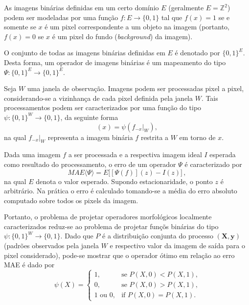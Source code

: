 \documentclass[10pt,a4paper,conference]{IEEEtran}
\begin{document}
As imagens binárias definidas em um certo domínio $E$ (geralmente
$E=\mathbb{Z}^2$) podem ser modeladas por uma função $f: E \to
\{0,1\}$ tal que $f(x)=1$ se e somente se $x$ é um pixel
correspondente a um objeto na imagem (portanto, $f(x)=0$ se $x$
é um pixel do fundo (\emph{background}) da imagem).

O conjunto de todas as imagens binárias definidas em $E$ é denotado
por $\{0,1\}^E$. Desta forma, um operador de imagens binárias é um
mapeamento do tipo $\Psi: \{0,1\}^E \to \{0,1\}^E$. 

Seja $W$ uma janela de observação. Imagens podem ser processadas pixel
a pixel, considerando-se a vizinhança de cada pixel definida pela
janela $W$. Tais processamentos podem ser caracterizados por uma
função do tipo $\psi: \{0,1\}^W \to \{0,1\}$, da seguinte forma
\begin{equation}
[\Psi(f)](x) = \psi(f_{-x}|_W),
\end{equation} 
na qual $f_{-x}|_W$ representa a imagem binária $f$ restrita a $W$ em
torno de $x$. 



Dada uma imagem $f$ a ser processada e a respectiva imagem ideal $I$
esperada como resultado do processamento, o erro de um operador $\Psi$
é caracterizado por
\begin{equation}
MAE\langle \Psi \rangle = E \big[ [\Psi(f)](z) - I(z) \big]\,,
\end{equation}
na qual $E$ denota o valor esperado.
Supondo estacionaridade, o ponto $z$ é arbitrário. Na prática o erro é
calculado tomando-se a média do erro absoluto computado sobre
todos os pixels da imagem.

Portanto, o problema de projetar operadores morfológicos localmente
caracterizados reduz-se ao problema de projetar funçõs binárias do
tipo $\psi: \{0,1\}^W \to \{0,1\}$.
Dado que $P$ é a distribuição conjunta do processo
$(\mathbf{X},\mathbf{y})$ (padrões observados pela janela $W$ e
respectivo valor da imagem de saída para o pixel considerado), pode-se
mostrar que o operador ótimo em relação ao erro MAE é dado por
\begin{equation}
\label{eq:opt}
\psi(X) = \left\{
          \begin{array}{ll}
          1, & \mbox{se $P(X,0)<P(X,1)$,}\\
          0, & \mbox{se $P(X,0)>P(X,1)$,}\\
          1 \mbox{ ou } 0, & \mbox{if $P(X,0)=P(X,1)$.}
          \end{array}
\right.
\end{equation}
\end{document}

